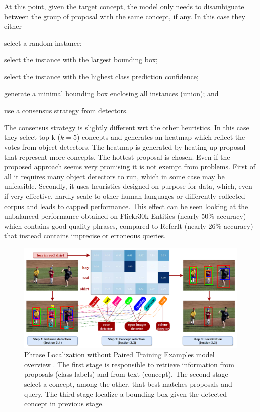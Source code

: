 At this point, given the target concept, the model only needs to
disambiguate between the group of proposal with the same concept, if
any. In this case they either
\begin{enumerate*}[label=(\roman*)] 
  \item select a random instance;
  \item select the instance with the largest bounding box; 
  \item select the instance with the highest class prediction
  confidence;
  \item generate a minimal bounding box enclosing all instances
  (union); and
  \item use a consensus strategy from detectors.
\end{enumerate*} 
The consensus strategy is slightly different wrt the other heuristics.
In this case they select top-k ($k = 5$) concepts and generates an
heatmap which reflect the votes from object detectors. The heatmap is
generated by heating up proposal that represent more concepts. The
hottest proposal is chosen. Even if the proposed approach seems very
promising it is not exempt from problems. First of all it requires
many object detectors to run, which in some case may be unfeasible.
Secondly, it uses heuristics designed on purpose for data, which, even
if very effective, hardly scale to other human languages or
differently collected corpus and leads to capped performance. This
effect can be seen looking at the unbalanced performance obtained on
Flickr30k Entities (nearly 50\% accuracy) which contains good quality
phrases, compared to ReferIt (nearly 26\% accuracy) that instead
contains imprecise or erroneous queries.

\begin{figure}
  \centering
  \includegraphics[width=.8\textwidth]{figures/phraseloc-model.png}
  \caption[Phrase Localization without Paired Training Examples model
  overview]{Phrase Localization without Paired Training Examples model
  overview \cite{wang2019phrase}. The first stage is responsible to
  retrieve information from proposals (class labels) and from text
  (concept). The second stage select a concept, among the other, that
  best matches proposals and query. The third stage localize a
  bounding box given the detected concept in previous stage.}
  \label{fig:phraseloc-model}
\end{figure}

